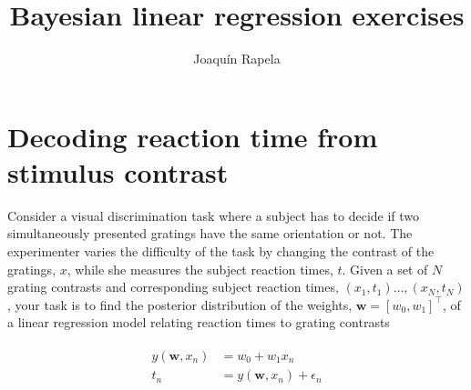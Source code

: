 \documentclass[12pt]{article}
\title{Bayesian linear regression exercises}
\author{Joaqu\'{i}n Rapela}
\begin{document}
\maketitle

\section{Decoding reaction time from stimulus contrast}

Consider a visual discrimination task where a subject has to decide if two
simultaneously presented gratings have the same orientation or not. The
experimenter varies the difficulty of the task by changing the contrast of the
gratings, $x$, while she measures the subject reaction times, $t$. Given a set
of $N$ grating contrasts and corresponding subject reaction times,
$(x_1,t_1)\ldots,(x_N,t_N)$, your task is to find the posterior distribution of
the weights, $\mathbf{w}=[w_0,w_1]^\intercal$, of a linear regression model
relating reaction times to grating contrasts

\begin{align}
    \begin{split}
        y(\mathbf{w}, x_n) &= w_0+w_1x_n\\
        t_n &= y(\mathbf{w}, x_n) +\epsilon_n\label{eq:rts}
    \end{split}
\end{align}
\end{document}
